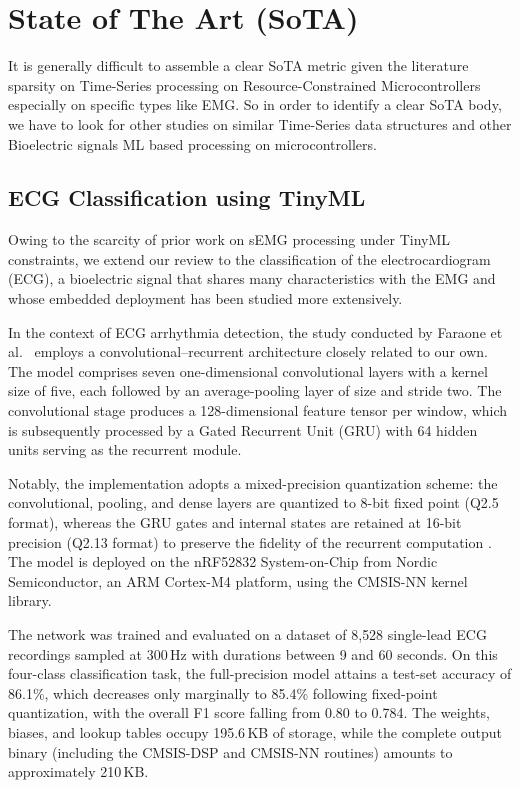 \documentclass[12pt,DIV16,BCOR12mm,a4paper,footinclude=false,headinclude,parskip=half-,twoside,openright,cleardoublepage=empty,toc=index,bibliography=totoc,listof=totoc]{scrreprt}
\numberwithin{equation}{chapter}
\begin{document}
    \chapter{State of The Art (SoTA)}
      It is generally difficult to assemble a clear SoTA metric given the literature sparsity on Time-Series
      processing on Resource-Constrained Microcontrollers especially on specific types like EMG. So in order to 
      identify a clear SoTA body, we have to look for other studies on similar Time-Series data structures
      and other Bioelectric signals ML based processing on microcontrollers.

      \section{ECG Classification using TinyML}
      Owing to the scarcity of prior work on sEMG processing under TinyML constraints, we extend our
      review to the classification of the electrocardiogram (ECG), a bioelectric signal that shares many
      characteristics with the EMG and whose embedded deployment has been studied more extensively.

      In the context of ECG arrhythmia detection, the study conducted by Faraone et al.\
      \cite{faraoneConvolutionalRecurrentNeuralNetworks2020} employs a convolutional--recurrent
      architecture closely related to our own. The model comprises seven one-dimensional convolutional
      layers with a kernel size of five, each followed by an average-pooling layer of size and stride two.
      The convolutional stage produces a 128-dimensional feature tensor per window, which is subsequently
      processed by a Gated Recurrent Unit (GRU) with 64 hidden units serving as the recurrent module.

      Notably, the implementation adopts a mixed-precision quantization scheme: the convolutional, pooling,
      and dense layers are quantized to 8-bit fixed point (Q2.5 format), whereas the GRU gates and internal
      states are retained at 16-bit precision (Q2.13 format) to preserve the fidelity of the recurrent
      computation \cite{faraoneConvolutionalRecurrentNeuralNetworks2020}. The model is deployed on the
      nRF52832 System-on-Chip from Nordic Semiconductor, an ARM Cortex-M4 platform, using the CMSIS-NN
      kernel library.

      The network was trained and evaluated on a dataset of 8{,}528 single-lead ECG recordings sampled at
      300\,Hz with durations between 9 and 60 seconds. On this four-class classification task, the
      full-precision model attains a test-set accuracy of 86.1\%, which decreases only marginally to 85.4\%
      following fixed-point quantization, with the overall F1 score falling from 0.80 to 0.784. The
      weights, biases, and lookup tables occupy 195.6\,KB of storage, while the complete output binary
      (including the CMSIS-DSP and CMSIS-NN routines) amounts to approximately 210\,KB.
\end{document}

